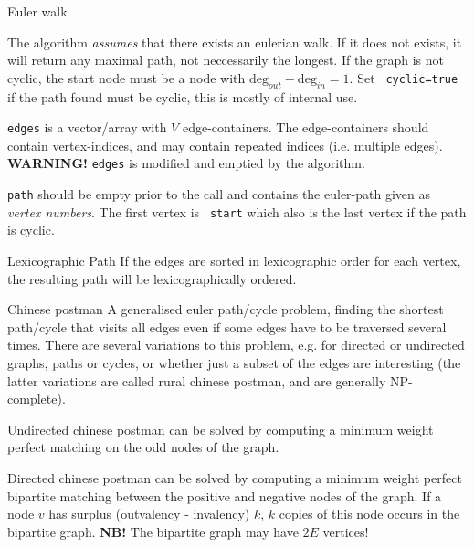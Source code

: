 
\begin{algorithm}{Euler walk}

\desc
The algorithm \emph{assumes} that there exists an eulerian walk. If it
does not exists, it will return any maximal path, not neccessarily the
longest.  If the graph is not cyclic, the start node must be a node
with $\mathrm{deg}_{out}-\mathrm{deg}_{in} = 1$.  Set {\tt
cyclic=true} if the path found must be cyclic, this is mostly of
internal use.

{\tt edges} is a vector/array with $V$ edge-containers. The
edge-containers should contain vertex-indices, and may contain
repeated indices (i.e. multiple edges). {\bf WARNING!} {\tt edges} is
modified and emptied by the algorithm.

{\tt path} should be empty prior to the call and contains the
euler-path given as \emph{vertex numbers}. The first vertex is {\tt
start} which also is the last vertex if the path is cyclic.

\item[Lexicographic Path] If the edges are sorted in lexicographic order for
each vertex, the resulting path will be lexicographically
ordered. 
\end{algorithm}


\begin{algorithm}{Chinese postman}
\desc
A generalised euler path/cycle problem, finding the shortest
path/cycle that visits all edges even if some edges have to be
traversed several times.  There are several variations to this
problem, e.g. for directed or undirected graphs, paths or cycles, or
whether just a subset of the edges are interesting (the latter
variations are called rural chinese postman, and are generally
NP-complete).

Undirected chinese postman can be solved by computing a minimum
weight perfect matching on the odd nodes of the graph.%

Directed chinese postman can be solved by computing a minimum weight
perfect bipartite matching between the positive and negative nodes of
the graph.  If a node $v$ has surplus (outvalency - invalency) $k$,
$k$ copies of this node occurs in the bipartite graph. {\bf NB!}  The
bipartite graph may have $2E$ vertices!
\end{algorithm}


